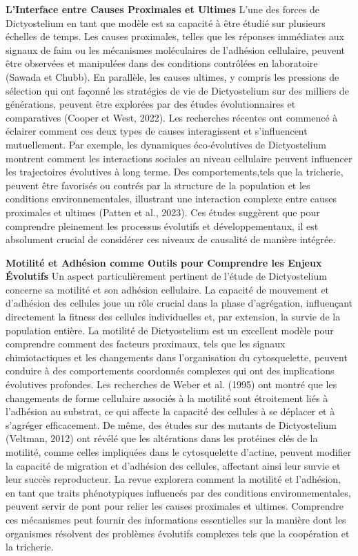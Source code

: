 \documentclass[twocolumn,10pt]{article} %
\begin{document}
\textbf{L'Interface entre Causes Proximales et Ultimes}
L'une des forces de Dictyostelium en tant que modèle est sa capacité à être étudié sur plusieurs échelles de temps. 
Les causes proximales, telles que les réponses immédiates aux signaux de faim ou les mécanismes moléculaires de l’adhésion 
cellulaire, peuvent être observées et manipulées dans des conditions contrôlées en laboratoire (Sawada et Chubb). En parallèle,
 les causes ultimes, y compris les pressions de sélection qui ont façonné les stratégies de vie de Dictyostelium sur des milliers
  de générations, peuvent être explorées par des études évolutionnaires et comparatives (Cooper et West, 2022).
Les recherches récentes ont commencé à éclairer comment ces deux types de causes interagissent et s'influencent mutuellement.
 Par exemple, les dynamiques éco-évolutives de Dictyostelium montrent comment les interactions sociales au niveau cellulaire
  peuvent influencer les trajectoires évolutives à long terme. Des comportements,tels que la tricherie, peuvent être favorisés
   ou contrés par la structure de la population et les conditions environnementales, illustrant une interaction complexe entre
    causes proximales et ultimes (Patten et al., 2023). Ces études suggèrent que pour comprendre pleinement les processus évolutifs
     et développementaux, il est absolument crucial de considérer ces niveaux de causalité de manière intégrée.

\textbf{Motilité et Adhésion comme Outils pour Comprendre les Enjeux Évolutifs}
Un aspect particulièrement pertinent de l'étude de Dictyostelium concerne sa motilité et son adhésion cellulaire. 
La capacité de mouvement et d'adhésion des cellules joue un rôle crucial dans la phase d'agrégation, influençant directement 
la fitness des cellules individuelles et, par extension, la survie de la population entière. La motilité de Dictyostelium est 
un excellent modèle pour comprendre comment des facteurs proximaux, tels que les signaux chimiotactiques et les changements dans 
l'organisation du cytosquelette, peuvent conduire à des comportements coordonnés complexes qui ont des implications évolutives
 profondes. Les recherches de Weber et al. (1995) ont montré que les changements de forme cellulaire associés à la motilité sont
  étroitement liés à l'adhésion au substrat, ce qui affecte la capacité des cellules à se déplacer et à s'agréger efficacement. 
  De même, des études sur des mutants de Dictyostelium (Veltman, 2012) ont révélé que les altérations dans les protéines clés de 
  la motilité, comme celles impliquées dans le cytosquelette d'actine, peuvent modifier la capacité de migration et d'adhésion des 
  cellules, affectant ainsi leur survie et leur succès reproducteur.
La revue explorera comment la motilité et l'adhésion, en tant que traits phénotypiques influencés par des conditions 
environnementales, peuvent servir de pont pour relier les causes proximales et ultimes. Comprendre ces mécanismes peut fournir 
des informations essentielles sur la manière dont les organismes résolvent des problèmes évolutifs complexes tels que la coopération 
et la tricherie.
\end{document}
